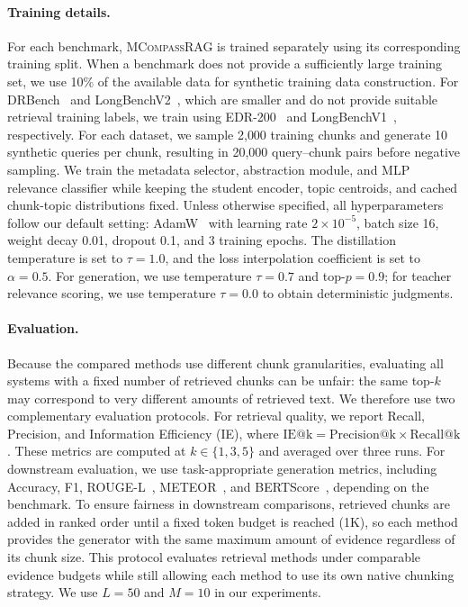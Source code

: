 \documentclass{llmxive}
\providecommand{\name}[1]{\textsc{MCompassRAG}\xspace}
\begin{document}
\paragraph{Training details.}
For each benchmark, \name{} is trained separately using its corresponding training split. When a benchmark does not provide a sufficiently large training set, we use 10\% of the available data for synthetic training data construction. For DRBench~\cite{abaskohi2026drbench} and LongBenchV2~\cite{bai-etal-2025-longbench}, which are smaller and do not provide suitable retrieval training labels, we train using EDR-200~\cite{prabhakar2025enterprisedeepresearchsteerable} and LongBenchV1~\cite{bai-etal-2024-longbench}, respectively. For each dataset, we sample 2{,}000 training chunks and generate 10 synthetic queries per chunk, resulting in 20{,}000 query--chunk pairs before negative sampling. We train the metadata selector, abstraction module, and MLP relevance classifier while keeping the student encoder, topic centroids, and cached chunk-topic distributions fixed. Unless otherwise specified, all hyperparameters follow our default setting: AdamW~\cite{loshchilov2018decoupled} with learning rate $2\times10^{-5}$, batch size 16, weight decay 0.01, dropout 0.1, and 3 training epochs. The distillation temperature is set to $\tau=1.0$, and the loss interpolation coefficient is set to $\alpha=0.5$. For generation, we use temperature $\tau=0.7$ and top-$p=0.9$; for teacher relevance scoring, we use temperature $\tau=0.0$ to obtain deterministic judgments.

\paragraph{Evaluation.}
Because the compared methods use different chunk granularities, evaluating all systems with a fixed number of retrieved chunks can be unfair: the same top-$k$ may correspond to very different amounts of retrieved text. We therefore use two complementary evaluation protocols. For retrieval quality, we report Recall, Precision, and Information Efficiency (IE), where $\mathrm{IE@k}=\mathrm{Precision@k}\times\mathrm{Recall@k}$. These metrics are computed at $k \in \{1,3,5\}$ and averaged over three runs. For downstream evaluation, we use task-appropriate generation metrics, including Accuracy, F1, ROUGE-L~\cite{lin-2004-rouge}, METEOR~\cite{banerjee-lavie-2005-meteor}, and BERTScore~\cite{Zhang2020BERTScore}, depending on the benchmark. To ensure fairness in downstream comparisons, retrieved chunks are added in ranked order until a fixed token budget is reached (1K), so each method provides the generator with the same maximum amount of evidence regardless of its chunk size. This protocol evaluates retrieval methods under comparable evidence budgets while still allowing each method to use its own native chunking strategy. We use $L=50$ and $M=10$ in our experiments.
\end{document}
